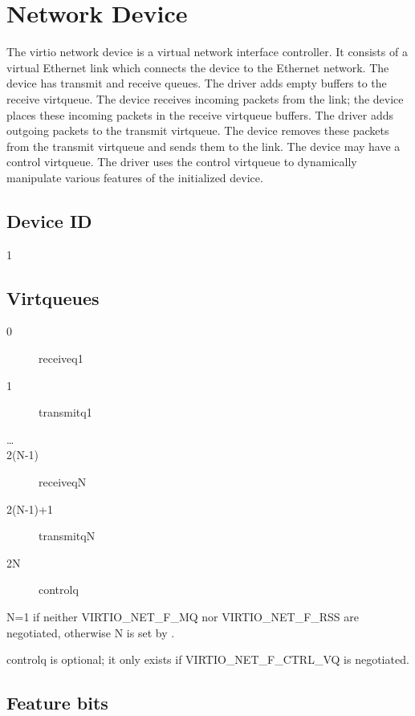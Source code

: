 \section{Network Device}\label{sec:Device Types / Network Device}

The virtio network device is a virtual network interface controller.
It consists of a virtual Ethernet link which connects the device
to the Ethernet network. The device has transmit and receive
queues. The driver adds empty buffers to the receive virtqueue.
The device receives incoming packets from the link; the device
places these incoming packets in the receive virtqueue buffers.
The driver adds outgoing packets to the transmit virtqueue. The device
removes these packets from the transmit virtqueue and sends them to
the link. The device may have a control virtqueue. The driver
uses the control virtqueue to dynamically manipulate various
features of the initialized device.

\subsection{Device ID}\label{sec:Device Types / Network Device / Device ID}

 1

\subsection{Virtqueues}\label{sec:Device Types / Network Device / Virtqueues}

\begin{description}
\item[0] receiveq1
\item[1] transmitq1
\item[\ldots]
\item[2(N-1)] receiveqN
\item[2(N-1)+1] transmitqN
\item[2N] controlq
\end{description}

 N=1 if neither VIRTIO_NET_F_MQ nor VIRTIO_NET_F_RSS are negotiated, otherwise N is set by
 .

controlq is optional; it only exists if VIRTIO_NET_F_CTRL_VQ is
negotiated.

\subsection{Feature bits}\label{sec:Device Types / Network Device / Feature bits}

